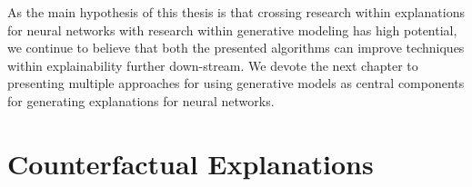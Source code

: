 \documentclass[11pt,a4paper,twoside,openright,final]{memoir}
\begin{document}
As the main hypothesis of this thesis is that crossing research within explanations for neural networks with research within generative modeling has high potential, we continue to believe that both the presented algorithms can improve techniques within explainability further down-stream.
We devote the next chapter to presenting multiple approaches for using generative models as central components for generating explanations for neural networks. 




\chapter{Counterfactual Explanations} 
\end{document}
